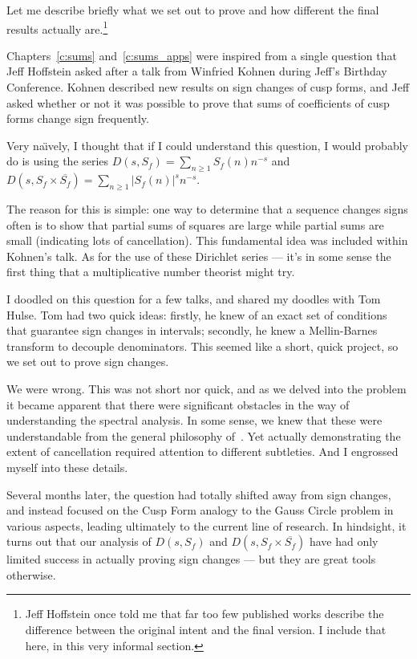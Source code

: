 
Let me describe briefly what we set out to prove and how different the final results
actually are.\footnote{Jeff Hoffstein once told me that far too few published works
  describe the difference between the original intent and the final version.
I include that here, in this very informal section.}


Chapters~\ref{c:sums} and~\ref{c:sums_apps} were inspired from a single question that Jeff
Hoffstein asked after a talk from Winfried Kohnen during Jeff's Birthday Conference.
Kohnen described new results on sign changes of cusp forms, and Jeff asked whether or not
it was possible to prove that sums of coefficients of cusp forms change sign frequently.


Very na{\"\i}vely, I thought that if I could understand this question, I would probably do
is using the series $D(s, S_f) = \sum_{n \geq 1} S_f(n) n^{-s}$ and $D(s, S_f \times
\overline{S_f}) = \sum_{n \geq 1} \lvert S_f(n) \rvert^s n^{-s}$.


The reason for this is simple: one way to determine that a sequence changes signs often is
to show that partial sums of squares are large while partial sums are small (indicating
lots of cancellation).
This fundamental idea was included within Kohnen's talk.
As for the use of these Dirichlet series --- it's in some sense the first thing that a
multiplicative number theorist might try.


I doodled on this question for a few talks, and shared my doodles with Tom Hulse.
Tom had two quick ideas: firstly, he knew of an exact set of conditions that guarantee
sign changes in intervals; secondly, he knew a Mellin-Barnes transform to decouple
denominators. This seemed like a short, quick project, so we set out to prove sign
changes.


We were wrong.
This was not short nor quick, and as we delved into the problem it became apparent that
there were significant obstacles in the way of understanding the spectral
analysis.
In some sense, we knew that these were understandable from the general philosophy
of~\cite{HoffsteinHulse13}.
Yet actually demonstrating the extent of cancellation required attention to different
subtleties.
And I engrossed myself into these details.


Several months later, the question had totally shifted away from sign changes, and instead
focused on the Cusp Form analogy to the Gauss Circle problem in various aspects, leading
ultimately to the current line of research.
In hindsight, it turns out that our analysis of $D(s, S_f)$ and $D(s, S_f \times
\overline{S_f})$ have had only limited success in actually proving sign changes --- but
they are great tools otherwise.



